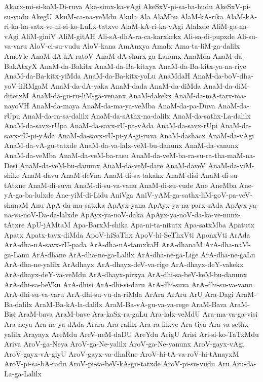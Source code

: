 {Akarx-mi-si-koM-Di-ruva
Aka-simx-ka-vAgi
AkeSxV-pi-sa-ba-hudu
AkeSxV-pi-su-vudu
AkegU
AkuM-ca-na-veMdu
Akula
Ala
AlaMbu
AlaM-kA-rika
AlaM-kA-ri-ka-ha-satx-ve-ni-si-ko-LuLx-tatxve
AlaM-kA-ri-ka-vAgi
Alalxde
AliM-ga-na-vAgi
AliM-giniV
AliM-gitAH
Ali-sA-dhA-ra-ca-karxkekx
Ali-sa-di-pupxde
Ali-su-va-varu
AloV-ci-su-vudu
AloV-kana
AmAnxya
Amalx
Ama-ta-liM-ga-dalilx
AmeVle
AnaM-dA-kA-ratoV
AnaM-dA-shurx-ga-Lanunx
AnaMda
AnaM-da-BakAtxyX
AnaM-da-Bakitx
AnaM-da-Ba-kitxya
AnaM-da-Ba-kitx-ya-na-riye
AnaM-da-Ba-kitx-yiMda
AnaM-da-Ba-kitx-yoLu
AnaMdaH
AnaM-da-boV-dha-yoV-liRMgaM
AnaM-da-dA-yaka
AnaM-dada
AnaM-da-diMda
AnaM-da-diM-ditetxM
AnaM-da-gu-ru-liM-ga-venanx
AnaM-dakekx
AnaM-da-mA-tarx-ma-nayoVH
AnaM-da-maya
AnaM-da-ma-ya-veMba
AnaM-da-pa-Duva
AnaM-da-rUpu
AnaM-da-ra-sa-dalilx
AnaM-da-sAthx-na-dalilx
AnaM-da-sathx-La-dalilx
AnaM-da-savx-rUpa
AnaM-da-savx-rU-pa-vAda
AnaM-da-savx-rUpi
AnaM-da-savx-rU-pi-yAda
AnaM-da-savx-rU-pi-yA-gi-ruva
AnaM-dashacx
AnaM-da-vAgi
AnaM-da-vA-gu-tatxde
AnaM-da-va-lalx-veM-bu-danunx
AnaM-da-vanunx
AnaM-da-veMba
AnaM-da-veM-ba-rasu
AnaM-da-veM-ba-ra-su-ra-tha-maM-na-Desi
AnaM-da-veM-bu-danunx
AnaM-da-veM-dare
AnaM-daveV
AnaM-da-viM-shike
AnaM-davu
AnaM-deVna
AnaM-di-sa-takakx
AnaM-disi
AnaM-di-su-tAtxne
AnaM-di-suva
AnaM-di-su-va-vanu
AnaM-di-su-vude
Ane
AneMba
Ane-yA-ga-ba-lulxde
Ane-yiM-di-Lidu
AniVga
AniV-yAM-ga-sathx-liM-goV-pa-veV-shanaM
Anu
ApA-da-ma-satxka
ApAyx-yana
ApAyx-ya-na-parx-sAda
ApAyx-ya-na-va-noV-Da-da-lalxde
ApAyx-ya-noV-daka
ApAyx-ya-noV-da-ka-ve-nunx-tAtxre
ApU-jAMtaM
Apa-BarxM-shika
Apa-ni-ta-nitutx
Apa-satxMba
Apatutx
Apatx
Apatx-tavx-diMda
ApoV-hiSaThx
ApoV-hi-SeThxVti
AponxVti
ArAda
ArA-dha-nA-savx-rU-pada
ArA-dha-nA-tamxkaH
ArA-dhanaM
ArA-dha-naM-ga-Lanu
ArA-dhane
ArA-dha-ne-ga-Lalilx
ArA-dha-ne-ga-Lige
ArA-dha-ne-gaLu
ArA-dha-ne-yalilx
ArAdhayx
ArA-dhayx-deV-va-rige
ArA-dhayx-deY-vakekx
ArA-dhayx-deY-va-veMdu
ArA-dhayx-pirxya
ArA-dhi-sa-beV-keM-bu-danunx
ArA-dhi-sa-beVku
ArA-dhisi
ArA-dhi-si-daru
ArA-dhi-suva
ArA-dhi-su-va-vanu
ArA-dhi-su-va-varu
ArA-dhi-su-vu-da-riMda
ArAra
ArAru
ArU
Ara-Dagi
AraM-Ba-dalilx
AraM-Ba-kA-la-dalilx
AraM-Ba-vA-gu-va-va-rege
AraM-Bava
AraM-Bisi
AraM-bava
AraM-bave
Ara-kaSx-ra-gaLu
Ara-lalx-veMdU
Ara-ma-va-ga-visi
Ara-neya
Ara-ne-ya-dAda
Arara
Ara-ralilx
Ara-ra-lilxye
Ara-tiya
Ara-va-sethx-yalilx
Arayayx
AreMdu
AreV-neM-daDU
AreYdu
ArigU
Arisi
Ari-si-ko-TaTxMdu
Ariva
AroV-ga-Neya
AroV-ga-Ne-yalilx
AroV-ga-Ne-yanunx
AroV-gayx-vAgi
AroV-gayx-vA-giyU
AroV-gayx-va-dhaRne
AroV-hi-tA-va-roV-hi-tAnayxM
AroV-pi-sa-bA-radu
AroV-pi-sa-beV-kA-gu-tatxde
AroV-pi-su-vudu
Aru
Aru-da-La-ga-Lalilx
}
